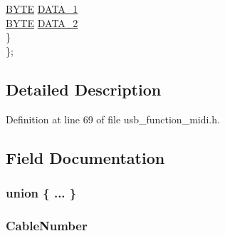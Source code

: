 \begin{DoxyCompactItemize}
\begin{tabbing}
\>\>\hyperlink{_generic_type_defs_8h_a4ae1dab0fb4b072a66584546209e7d58}{BYTE} \hyperlink{union_u_s_b___a_u_d_i_o___m_i_d_i___e_v_e_n_t___p_a_c_k_e_t_aa1444557cb650dc2ff0cff34e6e6ec5e}{DATA\_1}\\
\>\>\hyperlink{_generic_type_defs_8h_a4ae1dab0fb4b072a66584546209e7d58}{BYTE} \hyperlink{union_u_s_b___a_u_d_i_o___m_i_d_i___e_v_e_n_t___p_a_c_k_e_t_add89fc8d5878aeee730376ca04a48162}{DATA\_2}\\
\>\} \\
\}; \\

\end{tabbing}\end{DoxyCompactItemize}


\subsection{Detailed Description}


Definition at line 69 of file usb\+\_\+function\+\_\+midi.\+h.



\subsection{Field Documentation}
\hypertarget{union_u_s_b___a_u_d_i_o___m_i_d_i___e_v_e_n_t___p_a_c_k_e_t_a5e72aed2da0aeacc09045e495132604d}{}\subsubsection[{"@315}]{\setlength{\rightskip}{0pt plus 5cm}union \{ ... \} }\label{union_u_s_b___a_u_d_i_o___m_i_d_i___e_v_e_n_t___p_a_c_k_e_t_a5e72aed2da0aeacc09045e495132604d}
\hypertarget{union_u_s_b___a_u_d_i_o___m_i_d_i___e_v_e_n_t___p_a_c_k_e_t_a8e9aec21dcb7b98b04c771b5ee5a81c8}{}
\subsubsection[{Cable\+Number}]{ Cable\+Number}\label{union_u_s_b___a_u_d_i_o___m_i_d_i___e_v_e_n_t___p_a_c_k_e_t_a8e9aec21dcb7b98b04c771b5ee5a81c8}


